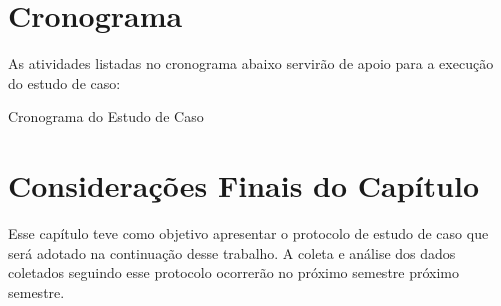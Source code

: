 \section{Cronograma}\label{sec:Cronograma}


As atividades listadas no cronograma abaixo servirão de apoio para a execução do estudo de caso:


	\begin{table}[!ht]
	\begin{center}
	
	 
	\caption{Cronograma do Estudo de Caso}
	\label{tab:cronograma}
	\end{center}
	\end{table}	
	\FloatBarrier	

\section{Considerações Finais do Capítulo} 

Esse capítulo teve como objetivo apresentar o protocolo de estudo de caso que será adotado na continuação desse trabalho. A coleta e análise dos dados coletados seguindo esse protocolo ocorrerão no próximo semestre próximo semestre.

\label{estudo de caso}

